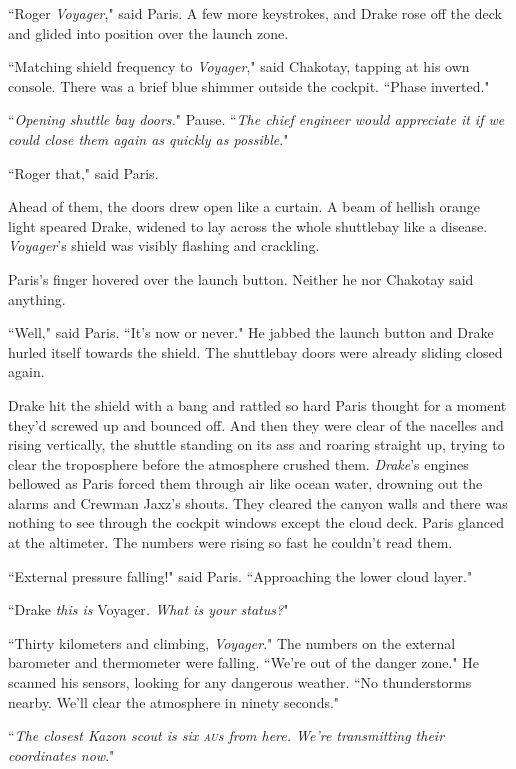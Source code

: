 \documentclass[twoside,letterpaper,12pt]{memoir}
\begin{document}
``Roger \textit{Voyager}," said Paris. A few more keystrokes, and Drake rose off the deck and glided into position over the launch zone.

``Matching shield frequency to \textit{Voyager}," said Chakotay, tapping at his own console. There was a brief blue shimmer outside the cockpit. ``Phase inverted."

``\textit{Opening shuttle bay doors.}" Pause. ``\textit{The chief engineer would appreciate it if we could close them again as quickly as possible}."

``Roger that," said Paris.

Ahead of them, the doors drew open like a curtain. A beam of hellish orange light speared Drake, widened to lay across the whole shuttlebay like a disease. \textit{Voyager}'s shield was visibly flashing and crackling.

Paris's finger hovered over the launch button. Neither he nor Chakotay said anything.

``Well," said Paris. ``It's now or never." He jabbed the launch button and Drake hurled itself towards the shield. The shuttlebay doors were already sliding closed again.

Drake hit the shield with a bang and rattled so hard Paris thought for a moment they'd screwed up and bounced off. And then they were clear of the nacelles and rising vertically, the shuttle standing on its ass and roaring straight up, trying to clear the troposphere before the atmosphere crushed them. \textit{Drake}'s engines bellowed as Paris forced them through air like ocean water, drowning out the alarms and Crewman Jaxz's shouts. They cleared the canyon walls and there was nothing to see through the cockpit windows except the cloud deck. Paris glanced at the altimeter. The numbers were rising so fast he couldn't read them.

``External pressure falling!" said Paris. ``Approaching the lower cloud layer."

``Drake \textit{this is }Voyager\textit{. What is your status?}"

``Thirty kilometers and climbing, \textit{Voyager}." The numbers on the external barometer and thermometer were falling. ``We're out of the danger zone." He scanned his sensors, looking for any dangerous weather. ``No thunderstorms nearby. We'll clear the atmosphere in ninety seconds."

``\textit{The closest Kazon scout is six \textsc{au}s from here. We're transmitting their coordinates now}."
\end{document}
